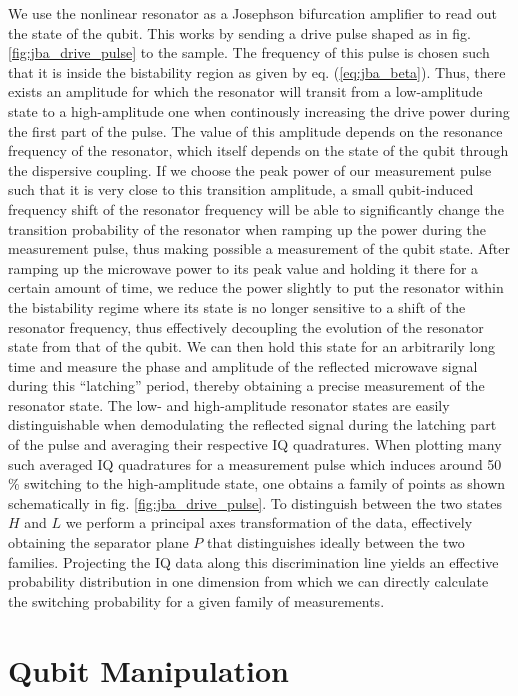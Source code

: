 We use the nonlinear resonator as a Josephson bifurcation amplifier to read out the state of the qubit. This works by sending a drive pulse shaped as in fig. \ref{fig:jba_drive_pulse} to the sample. The frequency of this pulse is chosen such that it is inside the bistability region as given by eq. (\ref{eq:jba_beta}). Thus, there exists an amplitude for which the resonator will transit from a low-amplitude state to a high-amplitude one when continously increasing the drive power during the first part of the pulse. The value of this amplitude depends on the resonance frequency of the resonator, which itself depends on the state of the qubit through the dispersive coupling. If we choose the peak power of our measurement pulse such that it is very close to this transition amplitude, a small qubit-induced frequency shift of the resonator frequency will be able to significantly change the transition probability of the resonator when ramping up the power during the measurement pulse, thus making possible a measurement of the qubit state. After ramping up the microwave power to its peak value and holding it there for a certain amount of time, we reduce the power slightly to put the resonator within the bistability regime where its state is no longer sensitive to a shift of the resonator frequency, thus effectively decoupling the evolution of the resonator state from that of the qubit. We can then hold this state for an arbitrarily long time and measure the phase and amplitude of the reflected microwave signal during this ``latching'' period, thereby obtaining a precise measurement of the resonator state. The low- and high-amplitude resonator states are easily distinguishable when demodulating the reflected signal during the latching part of the pulse and averaging their respective IQ quadratures. When plotting many such averaged IQ quadratures for a measurement pulse which induces around 50 \% switching to the high-amplitude state, one obtains a family of points as shown schematically in fig. \ref{fig:jba_drive_pulse}. To distinguish between the two states $H$ and $L$ we perform a principal axes transformation of the data, effectively obtaining the separator plane $P$ that distinguishes ideally between the two families. Projecting the IQ data along this discrimination line yields an effective probability distribution in one dimension from which we can directly calculate the switching probability for a given family of measurements.

\section{Qubit Manipulation}

